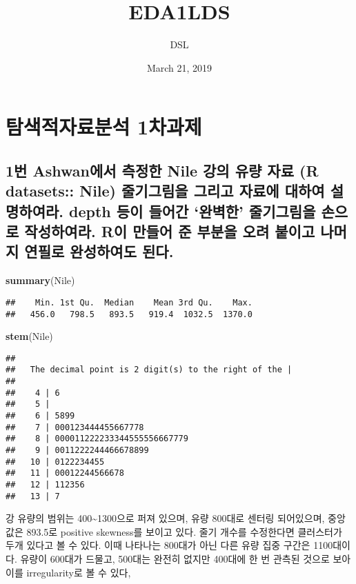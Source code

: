 \documentclass[]{article}
\title{EDA1LDS}
\author{DSL}
\date{March 21, 2019}
\newenvironment{Shaded}{\begin{snugshade}}{\end{snugshade}}
\newcommand{\KeywordTok}[1]{\textcolor[rgb]{0.13,0.29,0.53}{\textbf{#1}}}
\newcommand{\NormalTok}[1]{#1}
\begin{document}
\maketitle

\section{탐색적자료분석 1차과제}\label{-1}

\subsection{\texorpdfstring{1번 Ashwan에서 측정한 Nile 강의 유량 자료 (R
datasets:: Nile) 줄기그림을 그리고 자료에 대하여 설명하여라. depth 등이
들어간 `완벽한' 줄기그림을 손으로 작성하여라. R이 만들어 준 부분을 오려
붙이고 나머지 연필로 완성하여도
된다.}{1번 Ashwan에서 측정한 Nile 강의 유량 자료 (R datasets:: Nile) 줄기그림을 그리고 자료에 대하여 설명하여라. depth 등이 들어간 완벽한 줄기그림을 손으로 작성하여라. R이 만들어 준 부분을 오려 붙이고 나머지 연필로 완성하여도 된다.}}\label{-ashwan--nile----r-datasets-nile-----.-depth------.-r---------.}

\begin{Shaded}
\begin{Highlighting}[]
\KeywordTok{summary}\NormalTok{(Nile)}
\end{Highlighting}
\end{Shaded}

\begin{verbatim}
##    Min. 1st Qu.  Median    Mean 3rd Qu.    Max. 
##   456.0   798.5   893.5   919.4  1032.5  1370.0
\end{verbatim}

\begin{Shaded}
\begin{Highlighting}[]
\KeywordTok{stem}\NormalTok{(Nile)}
\end{Highlighting}
\end{Shaded}

\begin{verbatim}
## 
##   The decimal point is 2 digit(s) to the right of the |
## 
##    4 | 6
##    5 | 
##    6 | 5899
##    7 | 000123444455667778
##    8 | 000011222233344555556667779
##    9 | 0011222244466678899
##   10 | 0122234455
##   11 | 00012244566678
##   12 | 112356
##   13 | 7
\end{verbatim}

강 유량의 범위는 400\textasciitilde{}1300으로 퍼져 있으며, 유량 800대로
센터링 되어있으며, 중앙값은 893.5로 positive skewness를 보이고 있다.
줄기 개수를 수정한다면 클러스터가 두개 있다고 볼 수 있다. 이때 나타나는
800대가 아닌 다른 유량 집중 구간은 1100대이다. 유량이 600대가 드물고,
500대는 완전히 없지만 400대에 한 번 관측된 것으로 보아 이를
irregularity로 볼 수 있다,
\end{document}
